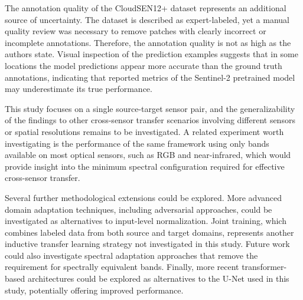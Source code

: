 The annotation quality of the CloudSEN12+ dataset represents an additional source of uncertainty. The dataset is described as expert-labeled, yet a manual quality review was necessary to remove patches with clearly incorrect or incomplete annotations. Therefore, the annotation quality is not as high as the authors state. Visual inspection of the prediction examples suggests that in some locations the model predictions appear more accurate than the ground truth annotations, indicating that reported metrics of the Sentinel-2 pretrained model may underestimate its true performance.

This study focuses on a single source-target sensor pair, and the generalizability of the findings to other cross-sensor transfer scenarios involving different sensors or spatial resolutions remains to be investigated. A related experiment worth investigating is the performance of the same framework using only bands available on most optical sensors, such as RGB and near-infrared, which would provide insight into the minimum spectral configuration required for effective cross-sensor transfer.

Several further methodological extensions could be explored. More advanced domain adaptation techniques, including adversarial approaches, could be investigated as alternatives to input-level normalization. Joint training, which combines labeled data from both source and target domains, represents another inductive transfer learning strategy not investigated in this study. Future work could also investigate spectral adaptation approaches that remove the requirement for spectrally equivalent bands. Finally, more recent transformer-based architectures could be explored as alternatives to the U-Net used in this study, potentially offering improved performance.
